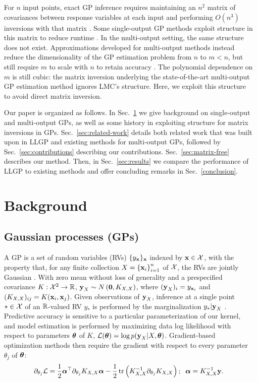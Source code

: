 \documentclass{article}
\begin{document}
For $n$ input points, exact GP inference requires maintaining an $n^2$  matrix of covariances between response variables at each input and performing $O(n^3)$ inversions with that matrix \cite{williams1996gaussian}. Some single-output GP methods exploit structure in this matrix to reduce runtime \cite{msgp}. In the multi-output setting, the same structure does not exist. Approximations developed for multi-output methods instead reduce the dimensionality of the GP estimation problem from $n$ to $m<n$, but still require $m$ to scale with $n$ to retain accuracy \cite{nguyen2014collaborative}. The polynomial dependence on $m$ is still cubic: the matrix inversion underlying the state-of-the-art multi-output GP estimation method ignores LMC's structure. Here, we exploit this structure to avoid direct matrix inversion.


Our paper is organized as follows. In Sec.~\ref{sec:background} we give background on single-output and multi-output GPs, as well as some history in exploiting structure for matrix inversions in GPs. Sec.~\ref{sec:related-work} details both related work that was built upon in LLGP and existing methods for multi-output GPs, followed by Sec.~\ref{sec:contributions} describing our contributions. Sec.~\ref{sec:matrix-free} describes our method. Then, in Sec.~\ref{sec:results} we compare the performance of LLGP to existing methods and offer concluding remarks in Sec.~\ref{conclusion}.


\section{Background}
\label{sec:background}

\subsection{Gaussian processes (GPs)}

A GP is a set of random variables (RVs) $\{y_{\textbf{x}}\}_{\textbf{x}}$ indexed by $\textbf{x}\in\mathcal{X}$, with the property that, for any finite collection $X=\left\{ \textbf{x}_i \right\}_{ i=1 }^{ n }$ of $\mathcal{X}$, the RVs are jointly Gaussian \cite{williams1996gaussian}. With zero mean without loss of generality and a prespecified covariance $K:\mathcal{X}^2\rightarrow\mathbb{R}$, $\textbf{y}_X\sim N\left({\textbf{0}, K_{X, X}}\right)$, where $(\textbf{y}_X)_i=y_{\textbf{x}_i}$ and $(K_{X,X})_{ij}=K(\textbf{x}_i,\textbf{x}_j)$. Given observations of $\textbf{y}_X$, inference at a single point $*\in\mathcal{X}$ of an $\mathbb{R}$-valued RV $y_*$ is performed by the marginalization $y_*|\textbf{y}_X$ \cite{williams1996gaussian}.
Predictive accuracy is sensitive to a particular parameterization of our kernel, and model estimation is performed by maximizing data log likelihood with respect to parameters ${\boldsymbol\theta}$ of $K$, $\mathcal{L}({\boldsymbol\theta})=\log p(\textbf{y}_{X}|X,{\boldsymbol\theta})$. Gradient-based optimization methods then require the gradient with respect to every parameter $\theta_j$ of ${\boldsymbol\theta}$:
\begin{align}
\partial_{\theta_j}\mathcal{L} = \frac{1}{2}{\boldsymbol\alpha}^\top\partial_{\theta_j}K_{X,X}{\boldsymbol\alpha} -\frac{1}{2}\operatorname{tr}\left({K_{X,X}^{-1}\partial_{\theta_j}K_{X,X}}\right);\;\; {\boldsymbol\alpha}=K_{X,X}^{-1}\textbf{y}.\label{llgradient}
\end{align}
\end{document}
